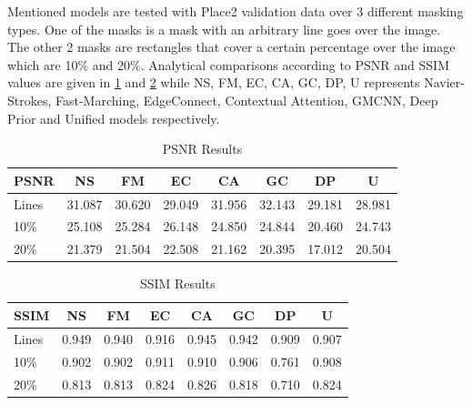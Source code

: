 Mentioned models are tested with Place2 validation data over 3 different masking types. One of the masks is a mask with an arbitrary line goes over the image. The other 2 masks are rectangles that cover a certain percentage over the image which are 10\% and 20\%. Analytical comparisons according to PSNR and SSIM values are given in \ref{tab:PSNRresults} and \ref{tab:SSIMresults} while NS, FM, EC, CA, GC, DP, U represents Navier-Strokes, Fast-Marching, EdgeConnect, Contextual Attention, GMCNN, Deep Prior and Unified models respectively.
\vspace*{2mm}
%
\begin{table}[!h]
\centering
\begin{tabular}{@{}l|c|c|c|c|c|c|l@{}}
\textbf{PSNR} & \multicolumn{1}{c}{NS} & \multicolumn{1}{c}{FM} & \multicolumn{1}{c}{EC} & \multicolumn{1}{c}{CA} & \multicolumn{1}{c}{GC} & \multicolumn{1}{c}{DP} & \multicolumn{1}{c}{U}  \\ \midrule
Lines     & 31.087   & 30.620   & 29.049   & 31.956   & 32.143  & 29.181  & 28.981 \\ \cmidrule(l){2-8} 
10\%          & 25.108                    & 25.284                     & 26.148                  & 24.850                  & 24.844                  & 20.460                     & 24.743 \\ \cmidrule(l){2-8} 
20\%          & 21.379                   & 21.504                     & 22.508                  & 21.162                  & 20.395                  & 17.012                  & 20.504 \\ \bottomrule
\end{tabular}
\caption{PSNR Results}
\label{tab:PSNRresults}
\end{table}

\newpage

\begin{table}[!h]
\centering
\begin{tabular}{@{}l|c|c|c|c|c|c|l@{}}
\textbf{SSIM} & \multicolumn{1}{c}{NS} & \multicolumn{1}{c}{FM} & \multicolumn{1}{c}{EC} & \multicolumn{1}{c}{CA} & \multicolumn{1}{c}{GC} & \multicolumn{1}{c}{DP} & \multicolumn{1}{c}{U}     \\ \midrule
Lines         & 0.949                  & 0.940                    & 0.916                   & 0.945                   & 0.942                   & 0.909                    & 0.907 \\ \cmidrule(l){2-8} 
10\%          & 0.902                    & 0.902                & 0.911                   & 0.910                   & 0.906                   & 0.761                    & 0.908 \\ \cmidrule(l){2-8} 
20\%          & 0.813                   & 0.813                      & 0.824                   & 0.826                   & 0.818                   & 0.710                 & 0.824 \\ \bottomrule
\end{tabular}
\caption{SSIM Results}
\label{tab:SSIMresults}
\end{table}

